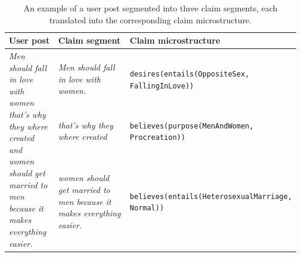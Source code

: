 \begin{table}[t]
\begin{center}
{\footnotesize
	\begin{tabular}{@{}p{0.17\linewidth} p{0.25\linewidth} p{0.55\linewidth}@{}}
\toprule
\textbf{User post} & \textbf{Claim segment} & 
		\textbf{Claim microstructure}       \\
\midrule
\multirow{3}{*}{\parbox{2.6cm}{
		\emph{Men should fall in love with women that's why they where
		created and women should get married to men because it makes
		everything easier. }
}}
&  
\emph{Men should fall in love with women.}
&
		\texttt{desires(entails(OppositeSex, FallingInLove))}
\\
\cmidrule{2-3}
& \emph{that's why they where created} 
 & 
		\texttt{believes(purpose(MenAndWomen, Procreation))}
 \\
\cmidrule{2-3}
& \emph{women should get married to men because it makes everything easier.} 
 &
 \texttt{believes(entails(HeterosexualMarriage, Normal)) } \\
 \bottomrule
\end{tabular}}
\end{center}
\caption{An example of a user post segmented into three claim segments, each
	translated into the corresponding claim
	microstructure.}
\label{microstruc:tab:post_segments}
\end{table}

